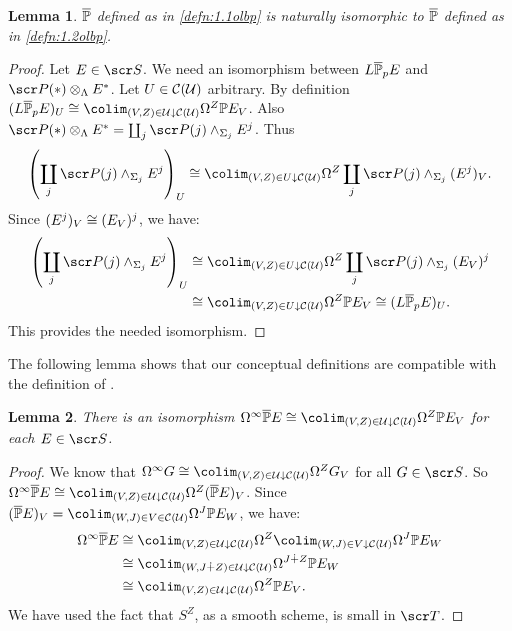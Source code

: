 \documentclass{amsart}
\newtheorem{lem}{Lemma}[section]
\theoremstyle{definition}
\begin{document}
\begin{lem}
$\overline{\mathbb{P}}$ defined as in \ref{defn:1.1olbp} is naturally isomorphic to $\overline{\mathbb{P}}$ defined as in \ref{defn:1.2olbp}.
\end{lem}
\begin{proof}
Let $E \in \sS$. We need an isomorphism between $L\overline{\mathbb{P}}_p E$ and $\sP(*) \ten_{\LA} E^*$. Let $U \in {\mathcal{C}}({\mathcal{U}})$ arbitrary. By definition $(L \ol{\bP}_{p}E)_U \iso \colim_{(V,Z) \in \oU \downarrow \oC(\oU)} \OM^Z \bP E_V$. Also $\sP(*) \ten_{\LA} E^* = \coprod_j \sP(j) \sma_{\SI_j} E^j$. Thus \[\left(\coprod_j \sP(j) \sma_{\SI_j} E^j \right)_U \iso \colim_{(V,Z) \in U \downarrow \oC(\oU)} \OM^Z \coprod_j \sP(j) \sma_{\SI_j} (E^j)_V.\]
\noindent Since $(E^j)_V \cong (E_V)^j$, we have:
\begin{equation*}
\begin{split}
\left(\coprod_j \sP(j) \sma_{\SI_j} E^j \right)_U &\iso \colim_{(V,Z) \in U \downarrow \oC(\oU)} \OM^Z \coprod_j \sP(j) \sma_{\SI_j} (E_V)^j\\
&\iso \colim_{(V,Z) \in U \downarrow \oC(\oU)} \OM^Z \bP E_V \iso (L \ol{\bP}_p E)_U.
\end{split}
\end{equation*}
This provides the needed isomorphism.
\end{proof}

The following lemma shows that our conceptual definitions are compatible with the definition of \cite{Barratt1974oper2}.
\begin{lem}
There is an isomorphism $\OM^{\infty} \ol{\bP} E \iso \colim_{(V,Z) \in \oU \downarrow \oC (\oU)} \OM^Z \bP E_V$ for each $E \in \sS$.
\end{lem}
\begin{proof}
We know that $\OM^{\infty} G \iso \colim_{(V,Z) \in \oU \downarrow \oC(\oU)} \OM^Z G_V$ for all $G \in \sS$. So $\OM^{\infty}\ol{\bP}E \iso \colim_{(V,Z) \in \oU \downarrow \oC(\oU)} \OM^Z (\ol{\bP}E)_V$. Since $(\ol{\bP}E)_V = \colim_{(W,J) \in V \in \oC(\oU)} \OM^J \bP E_W$, we have:
\begin{equation*}
\begin{split}
\OM^{\infty} \ol{\bP}E &\iso \colim_{(V,Z)\in \oU \downarrow \oC(\oU)} \OM^Z \colim_{(W,J) \in V \downarrow \oC(\oU)} \OM^J \bP E_W\\
&\iso \colim_{(W,J \dotplus Z) \in \oU \downarrow \oC(\oU)} \OM^{J \dotplus Z} \bP E_W\\
&\iso \colim_{(V,Z) \in \oU \downarrow \oC(\oU)} \OM^Z \bP E_V.
\end{split}
\end{equation*}
We have used the fact that $S^Z$, as a smooth scheme, is small in $\sT$.  
\end{proof}
\end{document}
